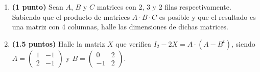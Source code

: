 
\begin{enumerate}[label=\alph*)]
\item \textbf{(1 punto)} Sean $A$, $B$ y $C$ matrices con 2, 3 y 2 filas respectivamente. Sabiendo que el producto de matrices $A\cdot B\cdot C$ es posible y que el resultado es una matriz con 4 columnas, halle las dimensiones de dichas matrices.
\item \textbf{(1.5 puntos)} Halle la matriz $X$ que verifica $I_2-2X=A\cdot(A-B^t)$, siendo $A=\begin{pmatrix}1&-1\\2&-1\end{pmatrix}$ y $B=\begin{pmatrix}0&2\\-1&2\end{pmatrix}$.
\end{enumerate}
